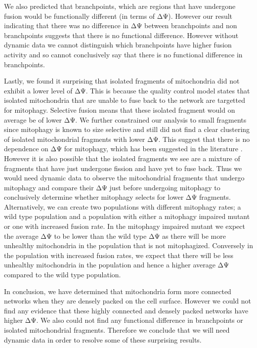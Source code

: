We also predicted that branchpoints, which are regions that have undergone fusion would be functionally different (in terms of ΔΨ). However our result indicating that there was no difference in ΔΨ between branchpoints and non branchpoints suggests that there is no functional difference. However without dynamic data we cannot distinguish which branchpoints have higher fusion activity and so cannot conclusively say that there is no functional difference in branchpoints. 

Lastly, we found it surprising that isolated fragments of mitochondria did not exhibit a lower level of ΔΨ. This is because the quality control model states that isolated mitochondria that are unable to fuse back to the network are targetted for mitophagy. Selective fusion means that these isolated fragment would on average be of lower ΔΨ. We further constrained our analysis to small fragments since mitophagy is known to size selective and still did not find a clear clustering of isolated mitochondrial fragments with lower ΔΨ. This suggest that there is no dependence on ΔΨ for mitophagy, which has been suggested in the literature \cite{hoitzing_what_2015}. However it is also possible that the isolated fragments we see are a mixture of fragments that have just undergone fission and have yet to fuse back. Thus we would need dynamic data to observe the mitochondrial fragments that undergo mitophagy and compare their ΔΨ just before undergoing mitophagy to conclusively determine whether mitophagy selects for lower ΔΨ fragments. Alternatively, we can create two populations with different mitophagy rates; a wild type population and a population with either a mitophagy impaired mutant \cite{kanki_atg32_2009} or one with increased fusion rate. In the mitophagy impaired mutant we expect the average ΔΨ to be lower than the wild type ΔΨ as there will be more unhealthy mitochondria in the population that is not mitophagized. Conversely in the population with increased fusion rates, we expect that there will be less unhealthy mitochondria in the population and hence a higher average ΔΨ compared to the wild type population.

In conclusion, we have determined that mitochondria form more connected networks when they are densely packed on the cell surface. However we could not find any evidence that these highly connected and densely packed networks have higher ΔΨ. We also could not find any functional difference in branchpoints or isolated mitochondrial fragments. Therefore we conclude that we will need dynamic data in order to resolve some of these surprising results.
\bigskip


